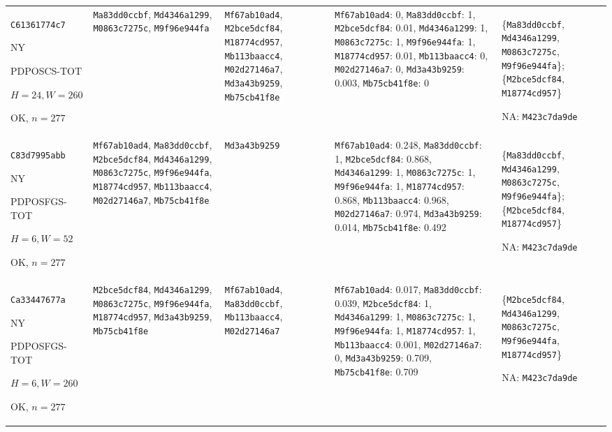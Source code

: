 \begin{longtable}{p{.15\linewidth}p{.17\linewidth}p{.17\linewidth}p{.25\linewidth}p{.14\linewidth}}
\texttt{C61361774c7}\par NY\par PDPOSCS-\allowbreak{}TOT\par $H=24,W=260$\par OK, $n=277$ & \texttt{Ma83dd0ccbf}, \texttt{Md4346a1299}, \texttt{M0863c7275c}, \texttt{M9f96e944fa} & \texttt{Mf67ab10ad4}, \texttt{M2bce5dcf84}, \texttt{M18774cd957}, \texttt{Mb113baacc4}, \texttt{M02d27146a7}, \texttt{Md3a43b9259}, \texttt{Mb75cb41f8e} & \texttt{Mf67ab10ad4}: 0, \texttt{Ma83dd0ccbf}: 1, \texttt{M2bce5dcf84}: 0.01, \texttt{Md4346a1299}: 1, \texttt{M0863c7275c}: 1, \texttt{M9f96e944fa}: 1, \texttt{M18774cd957}: 0.01, \texttt{Mb113baacc4}: 0, \texttt{M02d27146a7}: 0, \texttt{Md3a43b9259}: 0.003, \texttt{Mb75cb41f8e}: 0 & \{\texttt{Ma83dd0ccbf}, \texttt{Md4346a1299}, \texttt{M0863c7275c}, \texttt{M9f96e944fa}\}; \{\texttt{M2bce5dcf84}, \texttt{M18774cd957}\}\par NA: \texttt{M423c7da9de} \\
\texttt{C83d7995abb}\par NY\par PDPOSFGS-\allowbreak{}TOT\par $H=6,W=52$\par OK, $n=277$ & \texttt{Mf67ab10ad4}, \texttt{Ma83dd0ccbf}, \texttt{M2bce5dcf84}, \texttt{Md4346a1299}, \texttt{M0863c7275c}, \texttt{M9f96e944fa}, \texttt{M18774cd957}, \texttt{Mb113baacc4}, \texttt{M02d27146a7}, \texttt{Mb75cb41f8e} & \texttt{Md3a43b9259} & \texttt{Mf67ab10ad4}: 0.248, \texttt{Ma83dd0ccbf}: 1, \texttt{M2bce5dcf84}: 0.868, \texttt{Md4346a1299}: 1, \texttt{M0863c7275c}: 1, \texttt{M9f96e944fa}: 1, \texttt{M18774cd957}: 0.868, \texttt{Mb113baacc4}: 0.968, \texttt{M02d27146a7}: 0.974, \texttt{Md3a43b9259}: 0.014, \texttt{Mb75cb41f8e}: 0.492 & \{\texttt{Ma83dd0ccbf}, \texttt{Md4346a1299}, \texttt{M0863c7275c}, \texttt{M9f96e944fa}\}; \{\texttt{M2bce5dcf84}, \texttt{M18774cd957}\}\par NA: \texttt{M423c7da9de} \\
\texttt{Ca33447677a}\par NY\par PDPOSFGS-\allowbreak{}TOT\par $H=6,W=260$\par OK, $n=277$ & \texttt{M2bce5dcf84}, \texttt{Md4346a1299}, \texttt{M0863c7275c}, \texttt{M9f96e944fa}, \texttt{M18774cd957}, \texttt{Md3a43b9259}, \texttt{Mb75cb41f8e} & \texttt{Mf67ab10ad4}, \texttt{Ma83dd0ccbf}, \texttt{Mb113baacc4}, \texttt{M02d27146a7} & \texttt{Mf67ab10ad4}: 0.017, \texttt{Ma83dd0ccbf}: 0.039, \texttt{M2bce5dcf84}: 1, \texttt{Md4346a1299}: 1, \texttt{M0863c7275c}: 1, \texttt{M9f96e944fa}: 1, \texttt{M18774cd957}: 1, \texttt{Mb113baacc4}: 0.001, \texttt{M02d27146a7}: 0, \texttt{Md3a43b9259}: 0.709, \texttt{Mb75cb41f8e}: 0.709 & \{\texttt{M2bce5dcf84}, \texttt{Md4346a1299}, \texttt{M0863c7275c}, \texttt{M9f96e944fa}, \texttt{M18774cd957}\}\par NA: \texttt{M423c7da9de} \\

\end{longtable}
